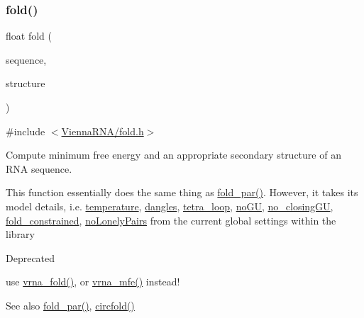 \subsubsection{\texorpdfstring{fold()}{fold()}}
{\footnotesize\ttfamily float fold (\begin{DoxyParamCaption}\item[{const char $\ast$}]{sequence,  }\item[{char $\ast$}]{structure }\end{DoxyParamCaption})}



{\ttfamily \#include $<$\mbox{\hyperlink{fold_8h}{Vienna\+R\+N\+A/fold.\+h}}$>$}



Compute minimum free energy and an appropriate secondary structure of an R\+NA sequence. 

This function essentially does the same thing as \mbox{\hyperlink{group__mfe__fold__single_ga2bc41df5d71fee6fd8da9904ee65d8fb}{fold\+\_\+par()}}. However, it takes its model details, i.\+e. \mbox{\hyperlink{group__model__details_gab4b11c8d9c758430960896bc3fe82ead}{temperature}}, \mbox{\hyperlink{group__model__details_ga72b511ed1201f7e23ec437e468790d74}{dangles}}, \mbox{\hyperlink{group__model__details_ga4f6265bdf0ead7ff4628a360adbfd77e}{tetra\+\_\+loop}}, \mbox{\hyperlink{group__model__details_gabf380d09e4f1ab94fc6af57cf0ad5d32}{no\+GU}}, \mbox{\hyperlink{group__model__details_gaa8d1c7b92489179e1eafa562b7bdd259}{no\+\_\+closing\+GU}}, \mbox{\hyperlink{fold__vars_8h_a0afc287c2464866d94858c39175154af}{fold\+\_\+constrained}}, \mbox{\hyperlink{group__model__details_ga097eccaabd6ae8b4fef83cccff85bb5d}{no\+Lonely\+Pairs}} from the current global settings within the library

\begin{DoxyRefDesc}{Deprecated}
\item[\mbox{\hyperlink{deprecated__deprecated000071}{Deprecated}}]use \mbox{\hyperlink{group__mfe__fold__single_ga29a33b2895f4e67b0480271ff289afdc}{vrna\+\_\+fold()}}, or \mbox{\hyperlink{group__mfe__fold_gabd3b147371ccf25c577f88bbbaf159fd}{vrna\+\_\+mfe()}} instead!\end{DoxyRefDesc}


\begin{DoxySeeAlso}{See also}
\mbox{\hyperlink{group__mfe__fold__single_ga2bc41df5d71fee6fd8da9904ee65d8fb}{fold\+\_\+par()}}, \mbox{\hyperlink{group__mfe__fold__single_ga4ac63ab3e8d9a80ced28b8052d94e423}{circfold()}}
\end{DoxySeeAlso}

